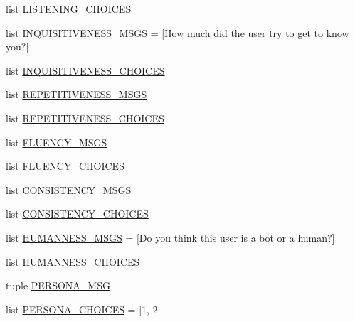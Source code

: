 \begin{DoxyCompactItemize}
\item 
list \hyperlink{namespaceprojects_1_1controllable__dialogue_1_1mturk_1_1worlds_a130a9e2bd7e3e46535cdf26884fbad3c}{L\+I\+S\+T\+E\+N\+I\+N\+G\+\_\+\+C\+H\+O\+I\+C\+ES}
\item 
list \hyperlink{namespaceprojects_1_1controllable__dialogue_1_1mturk_1_1worlds_a5d4f3f83413338852f5c159d64abcc16}{I\+N\+Q\+U\+I\+S\+I\+T\+I\+V\+E\+N\+E\+S\+S\+\_\+\+M\+S\+GS} = \mbox{[}\textquotesingle{}How much did the user try to get to know you?\textquotesingle{}\mbox{]}
\item 
list \hyperlink{namespaceprojects_1_1controllable__dialogue_1_1mturk_1_1worlds_af9241a787cb979ad57c305e5ac610158}{I\+N\+Q\+U\+I\+S\+I\+T\+I\+V\+E\+N\+E\+S\+S\+\_\+\+C\+H\+O\+I\+C\+ES}
\item 
list \hyperlink{namespaceprojects_1_1controllable__dialogue_1_1mturk_1_1worlds_a2bda1b01038b9d2b2ab42c178a55315b}{R\+E\+P\+E\+T\+I\+T\+I\+V\+E\+N\+E\+S\+S\+\_\+\+M\+S\+GS}
\item 
list \hyperlink{namespaceprojects_1_1controllable__dialogue_1_1mturk_1_1worlds_aa24065b25a463fafb28b14fd622563dc}{R\+E\+P\+E\+T\+I\+T\+I\+V\+E\+N\+E\+S\+S\+\_\+\+C\+H\+O\+I\+C\+ES}
\item 
list \hyperlink{namespaceprojects_1_1controllable__dialogue_1_1mturk_1_1worlds_a850e7adaa3327405ef87aa7c4b15683a}{F\+L\+U\+E\+N\+C\+Y\+\_\+\+M\+S\+GS}
\item 
list \hyperlink{namespaceprojects_1_1controllable__dialogue_1_1mturk_1_1worlds_ae530fdcb074e6728edb4b12302144743}{F\+L\+U\+E\+N\+C\+Y\+\_\+\+C\+H\+O\+I\+C\+ES}
\item 
list \hyperlink{namespaceprojects_1_1controllable__dialogue_1_1mturk_1_1worlds_aad1c4fac08e86007fe59624a9266a09c}{C\+O\+N\+S\+I\+S\+T\+E\+N\+C\+Y\+\_\+\+M\+S\+GS}
\item 
list \hyperlink{namespaceprojects_1_1controllable__dialogue_1_1mturk_1_1worlds_a6e8149d898ef1122dbd1baed33aa5ebf}{C\+O\+N\+S\+I\+S\+T\+E\+N\+C\+Y\+\_\+\+C\+H\+O\+I\+C\+ES}
\item 
list \hyperlink{namespaceprojects_1_1controllable__dialogue_1_1mturk_1_1worlds_a22fc1764795745a1555e1b4d3af68e07}{H\+U\+M\+A\+N\+N\+E\+S\+S\+\_\+\+M\+S\+GS} = \mbox{[}\textquotesingle{}Do you think this user is a bot or a human?\textquotesingle{}\mbox{]}
\item 
list \hyperlink{namespaceprojects_1_1controllable__dialogue_1_1mturk_1_1worlds_a0f4418030edd821d6461823e4c92e290}{H\+U\+M\+A\+N\+N\+E\+S\+S\+\_\+\+C\+H\+O\+I\+C\+ES}
\item 
tuple \hyperlink{namespaceprojects_1_1controllable__dialogue_1_1mturk_1_1worlds_a469fc3a9725886d31d424185a9f8b1b1}{P\+E\+R\+S\+O\+N\+A\+\_\+\+M\+SG}
\item 
list \hyperlink{namespaceprojects_1_1controllable__dialogue_1_1mturk_1_1worlds_a863971d866356d0e7d113837d91ec198}{P\+E\+R\+S\+O\+N\+A\+\_\+\+C\+H\+O\+I\+C\+ES} = \mbox{[}\textquotesingle{}1\textquotesingle{}, \textquotesingle{}2\textquotesingle{}\mbox{]}
\end{DoxyCompactItemize}


